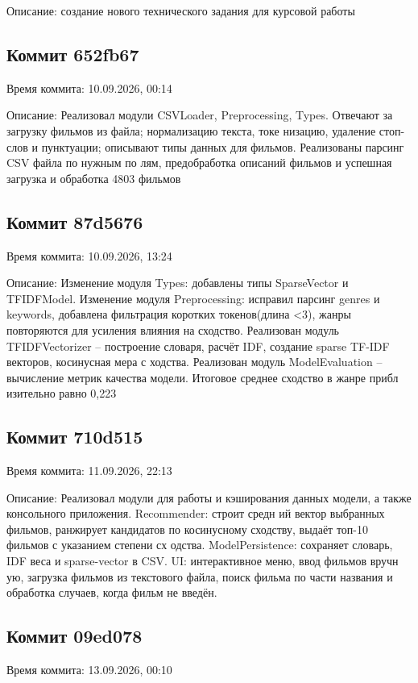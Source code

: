 \documentclass[a4paper, 16pt]{article}
\begin{document}
Описание: создание нового технического задания для курсовой работы

\subsection*{Коммит 652fb67}
Время коммита: 10.09.2026, 00:14

Описание: Реализовал модули CSVLoader, Preprocessing, Types. Отвечают за загрузку фильмов из файла; нормализацию текста, токе
низацию, удаление стоп-слов и пунктуации; описывают типы данных для фильмов. Реализованы парсинг CSV файла по нужным по
лям, предобработка описаний фильмов и успешная загрузка и обработка 4803 фильмов

\subsection*{Коммит 87d5676}
Время коммита: 10.09.2026, 13:24

Описание: Изменение модуля Types: добавлены типы SparseVector и TFIDFModel. Изменение модуля Preprocessing: исправил парсинг 
genres и keywords, добавлена фильтрация коротких токенов(длина <3), жанры повторяются для усиления влияния на сходство.
 Реализован модуль TFIDFVectorizer – построение словаря, расчёт IDF, создание sparse TF-IDF векторов, косинусная мера с
ходства. Реализован модуль ModelEvaluation – вычисление метрик качества модели. Итоговое среднее сходство в жанре прибл
изительно равно 0,223

\subsection*{Коммит 710d515}
Время коммита: 11.09.2026, 22:13

Описание: Реализовал модули для работы и кэширования данных модели, а также консольного приложения. Recommender: строит средн
ий вектор выбранных фильмов, ранжирует кандидатов по косинусному сходству, выдаёт топ-10 фильмов с указанием степени сх
одства. ModelPersistence: сохраняет словарь, IDF веса и sparse-vector в CSV. UI: интерактивное меню, ввод фильмов вручн
ую, загрузка фильмов из текстового файла, поиск фильма по части названия и обработка случаев, когда фильм не введён.

\subsection*{Коммит 09ed078}
Время коммита: 13.09.2026, 00:10
\end{document}
